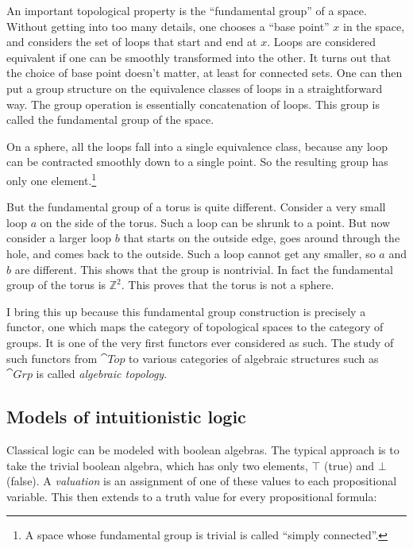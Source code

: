 \documentclass{article}
\begin{document}
An important topological property is the ``fundamental group'' of a
space.  Without getting into too many details, one chooses a ``base
point'' $x$ in the space, and considers the set of loops that start
and end at $x$. Loops are considered equivalent if one can be smoothly
transformed into the other.  It turns out that the choice of base
point doesn't matter, at least for connected sets.  One can then put a
group structure on the equivalence classes of loops in a
straightforward way.  The group operation is essentially concatenation
of loops.  This group is called the fundamental group of the space.

On a sphere, all the loops fall into a single equivalence class,
because any loop can be contracted smoothly down to a single point.
So the resulting group has only one element.\footnote{A space whose
  fundamental group is trivial is called ``simply connected''.}

But the fundamental group of a torus is quite different.  Consider a
very small loop $a$ on the side of the torus.  Such a loop can be
shrunk to a point.  But now consider a larger loop $b$ that starts on
the outside edge, goes around through the hole, and comes back to the
outside. Such a loop cannot get any smaller, so $a$ and $b$ are
different.  This shows that the group is nontrivial.  In fact the
fundamental group of the torus is $\mathbb Z^2$.  This proves that
the torus is not a sphere.


I bring this up because this fundamental group construction is
precisely a functor, one which maps the category of topological spaces
to the category of groups. It is one of the very first functors ever
considered as such.  The study of such functors from $\cat{Top}$ to
various categories of algebraic structures such as $\cat{Grp}$ is
called {\em algebraic topology\/}.

\subsection*{Models of intuitionistic logic}

Classical logic can be modeled with boolean algebras.  The typical
approach is to take the trivial boolean algebra, which has only two
elements, $\top$ (true) and $\bot$ (false).  A {\em valuation\/} is an
assignment of one of these values to each propositional variable.
This then extends to a truth value for every propositional formula: 
\end{document}
